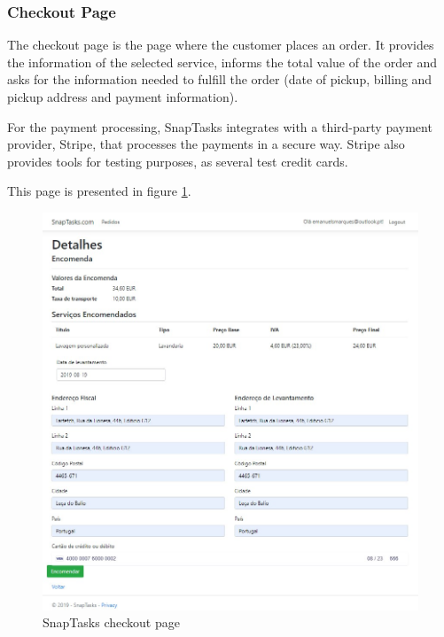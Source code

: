 \subsubsection{Checkout Page}
The checkout page is the page where the customer places an order. It provides the information of the selected service, informs the total value of the order and asks for the information needed to fulfill the order (date of pickup, billing and pickup address and payment information).
\par

For the payment processing, SnapTasks integrates with a third-party payment provider, Stripe, that processes the payments in a secure way. Stripe also provides tools for testing purposes, as several test credit cards.

\par

This page is presented in figure \ref{fig:snaptasksCheckout}.
\begin{figure}[ht]
\centering
\includegraphics[width=\textwidth,keepaspectratio]{chapters/Implementation/assets/snaptasks-checkout.jpg}
\caption[SnapTasks checkout page]{SnapTasks checkout page}
\label{fig:snaptasksCheckout}
\end{figure}


